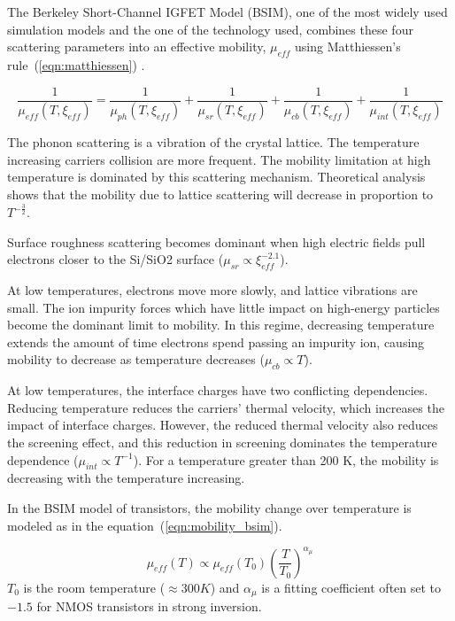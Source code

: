 The Berkeley Short-Channel IGFET Model (BSIM), one of the most widely used simulation models and the one of the technology used, combines these four scattering parameters into an effective mobility, \( \mu_{eff} \) using Matthiessen’s rule~(\ref{eqn:matthiessen}) \cite{Chain1997}.

\begin{equation}
\label{eqn:matthiessen}
\frac{1}{\mu_{eff}(T, \xi_{eff})} = \frac{1}{\mu_{ph}(T, \xi_{eff})} +
\frac{1}{\mu_{sr}(T, \xi_{eff})} + \frac{1}{\mu_{cb}(T, \xi_{eff})} + 
\frac{1}{\mu_{int}(T, \xi_{eff})}
\end{equation}

The phonon scattering is a vibration of the crystal lattice. The temperature increasing carriers collision are more frequent. The mobility limitation at high temperature is dominated by this scattering mechanism. Theoretical analysis shows that the mobility due to lattice scattering will decrease in proportion to \(T^{-\frac{3}{2}} \).

Surface roughness scattering becomes dominant when high electric fields pull electrons closer to the Si/SiO2 surface (\(\mu_{sr} \varpropto \xi_{eff}^{-2.1} \))\cite{KLee1991}.

At low temperatures, electrons move more slowly, and lattice vibrations are
small. The ion impurity forces which have little impact on high-energy
particles become the dominant limit to mobility. In this regime, decreasing temperature extends the amount of time electrons spend passing an impurity ion, causing mobility to decrease as temperature decreases (\(\mu_{cb} \varpropto T \)).

At low temperatures, the interface charges have two conflicting dependencies. Reducing temperature reduces the carriers’ thermal velocity, which increases the impact of interface charges. However, the reduced thermal velocity also reduces the screening effect\cite{Jeon1989}, and this reduction in screening dominates the temperature dependence (\(\mu_{int} \varpropto T^{-1} \)). For a temperature greater than 200 K, the mobility is decreasing with the temperature increasing.

In the BSIM model of transistors, the mobility change over temperature is modeled as in the equation~(\ref{eqn:mobility_bsim}).

\begin{equation}
\label{eqn:mobility_bsim}
\mu_{eff}(T) \varpropto \mu_{eff}(T_0) {\left(\frac{T}{T_0} \right)}^{\alpha_\mu}
\end{equation}
\(T_0 \) is the room temperature (\(\approx 300 K \)) and \(\alpha_\mu \) is a fitting coefficient often set to $-1.5$ for NMOS transistors in strong inversion.

